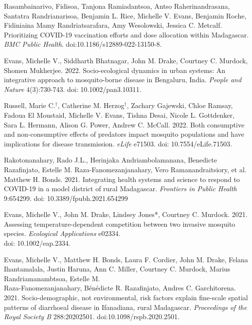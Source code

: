 \begin{etaremune}
\item Rasambainarivo, Fidisoa, Tanjona Ramiadantsoa, Antso Raherinandrasana, Santatra Randrianarisoa, Benjamin L. Rice, \textcolor{awesome}{Michelle V. Evans}, Benjamin Roche, Fidiniaina Mamy Randriatsarafara, Amy Wesolowski, Jessica C. Metcalf. Prioritizing COVID-19 vaccination efforts and dose allocation within Madagascar. \textit{BMC Public Health}. doi:10.1186/s12889-022-13150-8. \smallskip

\item \textcolor{awesome}{Evans, Michelle V.}, Siddharth Bhatnagar, John M. Drake, Courtney C. Murdock, Shomen Mukherjee. 2022. Socio-ecological dynamics in urban systems: An integrative approach to mosquito-borne disease in Bengaluru, India. \textit{People and Nature} 4(3):730-743. doi: 10.1002/pan3.10311. \smallskip

\item Russell, Marie C.$^\dagger$, Catherine M. Herzog$^\dagger$, Zachary Gajewski, Chloe Ramsay, Fadoua El Moustaid, \textcolor{awesome}{Michelle V. Evans}, Tishna Desai, Nicole L. Gottdenker, Sara L. Hermann, Alison G. Power, Andrew C. McCall. 2022. Both consumptive and non-consumptive effects of predators impact mosquito populations and have implications for disease transmission. \textit{eLife} e71503. doi: 10.7554/eLife.71503. \smallskip

\item Rakotonanahary, Rado J.L., Herinjaka Andriambolamanana, Benedicte Razafinjato, Estelle M. Raza-Fanomezanjanahary, Vero Ramanandraitsiory, et al. Matthew H. Bonds. 2021. Integrating health systems and science to respond to COVID-19 in a model district of rural Madagascar. \textit{Frontiers in Public Health} 9:654299. doi: 10.3389/fpubh.2021.654299 \smallskip

\item \textcolor{awesome}{Evans, Michelle V.}, John M. Drake, Lindsey Jones*, Courtney C. Murdock. 2021. Assessing temperature-dependent competition between two invasive mosquito species. \textit{Ecological Applications} e02334. \\ doi: 10.1002/eap.2334. \smallskip

\item \textcolor{awesome}{Evans, Michelle V.}, Matthew H. Bonds, Laura F. Cordier, John M. Drake, Felana Ihantamalala, Justin Haruna, Ann C. Miller, Courtney C. Murdock, Marius Randriamanambtsoa, Estelle M. \\ Raza-Fanomezanjanahary, Bénédicte R. Razafinjato, Andres C. Garchitorena. 2021. Socio-demographic, not environmental, risk factors explain fine-scale spatial patterns of diarrhoeal disease in Ifanadiana, rural Madagascar. \textit{Proceedings of the Royal Society B} 288:20202501. doi:10.1098/rspb.2020.2501. \smallskip


\end{etaremune}
